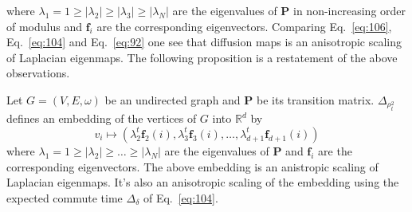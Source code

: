 where $\lambda_1 = 1 \geq |\lambda_2| \geq |\lambda_3| \geq
|\lambda_{N}|$ are the eigenvalues of $\mathbf{P}$ in non-increasing
order of modulus and $\mathbf{f}_i$ are the corresponding
eigenvectors. Comparing Eq.~\eqref{eq:106}, Eq.~\eqref{eq:104} and
Eq.~\eqref{eq:92} one see that diffusion maps is an anisotropic
scaling of Laplacian eigenmaps. The following proposition is a
restatement of the above observations.
\begin{proposition}
  \label{prop:22}
  Let $G = (V,E,\omega)$ be an undirected graph and $\mathbf{P}$ be
  its transition matrix. $\Delta_{\rho_{t}^{2}}$ defines an embedding
  of the vertices of $G$ into $\mathbb{R}^{d}$ by
  \begin{equation*}
    v_i \mapsto (\lambda_{2}^{t} \mathbf{f}_{2}(i), \lambda_{3}^{t}
    \mathbf{f}_{3}(i), \dots, \lambda_{d+1}^{t} \mathbf{f}_{d+1}(i))
  \end{equation*}
  where $\lambda_1 = 1 \geq |\lambda_2| \geq \dots \geq |\lambda_N|$
  are the eigenvalues of $\mathbf{P}$
  and $\mathbf{f}_{i}$ are the corresponding eigenvectors. The above
  embedding is an anistropic scaling of Laplacian eigenmaps. It's also an
  anisotropic scaling of the embedding using the
  expected commute time $\Delta_{\delta}$ of Eq.~\eqref{eq:104}.
\end{proposition}

